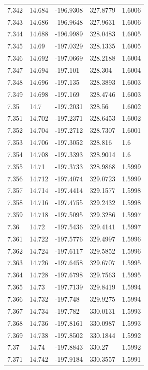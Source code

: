 \begin{tabular}{lllll}
7.342 & 14.684 & -196.9308 & 327.8779 & 1.6006 \\
7.343 & 14.686 & -196.9648 & 327.9631 & 1.6006 \\
7.344 & 14.688 & -196.9989 & 328.0483 & 1.6005 \\
7.345 & 14.69 & -197.0329 & 328.1335 & 1.6005 \\
7.346 & 14.692 & -197.0669 & 328.2188 & 1.6004 \\
7.347 & 14.694 & -197.101 & 328.304 & 1.6004 \\
7.348 & 14.696 & -197.135 & 328.3893 & 1.6003 \\
7.349 & 14.698 & -197.169 & 328.4746 & 1.6003 \\
7.35 & 14.7 & -197.2031 & 328.56 & 1.6002 \\
7.351 & 14.702 & -197.2371 & 328.6453 & 1.6002 \\
7.352 & 14.704 & -197.2712 & 328.7307 & 1.6001 \\
7.353 & 14.706 & -197.3052 & 328.816 & 1.6 \\
7.354 & 14.708 & -197.3393 & 328.9014 & 1.6 \\
7.355 & 14.71 & -197.3733 & 328.9868 & 1.5999 \\
7.356 & 14.712 & -197.4074 & 329.0723 & 1.5999 \\
7.357 & 14.714 & -197.4414 & 329.1577 & 1.5998 \\
7.358 & 14.716 & -197.4755 & 329.2432 & 1.5998 \\
7.359 & 14.718 & -197.5095 & 329.3286 & 1.5997 \\
7.36 & 14.72 & -197.5436 & 329.4141 & 1.5997 \\
7.361 & 14.722 & -197.5776 & 329.4997 & 1.5996 \\
7.362 & 14.724 & -197.6117 & 329.5852 & 1.5996 \\
7.363 & 14.726 & -197.6458 & 329.6707 & 1.5995 \\
7.364 & 14.728 & -197.6798 & 329.7563 & 1.5995 \\
7.365 & 14.73 & -197.7139 & 329.8419 & 1.5994 \\
7.366 & 14.732 & -197.748 & 329.9275 & 1.5994 \\
7.367 & 14.734 & -197.782 & 330.0131 & 1.5993 \\
7.368 & 14.736 & -197.8161 & 330.0987 & 1.5993 \\
7.369 & 14.738 & -197.8502 & 330.1844 & 1.5992 \\
7.37 & 14.74 & -197.8843 & 330.27 & 1.5992 \\
7.371 & 14.742 & -197.9184 & 330.3557 & 1.5991 \\

\end{tabular}
